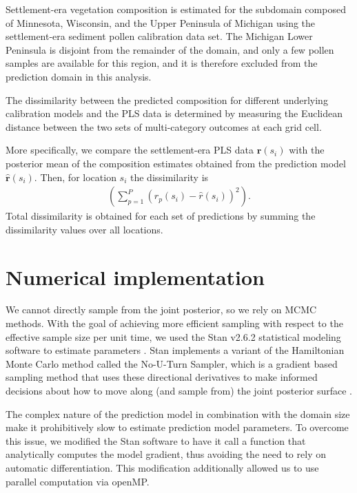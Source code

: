 \documentclass[12pt]{article}
\begin{document}
Settlement-era vegetation composition is estimated for the subdomain
composed of Minnesota, Wisconsin, and the Upper Peninsula of Michigan
using the settlement-era sediment pollen calibration data set. The
Michigan Lower Peninsula is disjoint from the remainder of the domain,
and only a few pollen samples are available for this region, and it is
therefore excluded from the prediction domain in this analysis.

The dissimilarity between the predicted composition for different
underlying calibration models and the PLS data is determined by
measuring the Euclidean distance between the two sets of
multi-category outcomes at each grid cell.

More specifically, we compare the settlement-era PLS data
$\bm{r}(s_i)$ with the posterior mean of the composition estimates
obtained from the prediction model $\hat{\bm{r}}(s_i)$. Then, for
location $s_i$ the dissimilarity is
\begin{align*}
\left( \sum_{p=1}^{P} (r_p(s_i) - \hat{r}(s_i))^2 \right).
\end{align*}
Total dissimilarity is obtained for each set of predictions by summing
the dissimilarity values over all locations.

\section{Numerical implementation}
\label{sec:imp}

We cannot directly sample from the joint posterior, so we rely on MCMC
methods. With the goal of achieving more efficient sampling with
respect to the effective sample size per unit time, we used the Stan
v2.6.2 statistical modeling software to estimate parameters
\citep{stan-software:2014}. Stan implements a variant of the
Hamiltonian Monte Carlo method called the No-U-Turn Sampler, which is
a gradient based sampling method that uses these directional
derivatives to make informed decisions about how to move along (and
sample from) the joint posterior surface \citep{hoffman2011nuts}.

The complex nature of the prediction model in combination with the
domain size make it prohibitively slow to estimate prediction model
parameters. To overcome this issue, we modified the Stan software to
have it call a function that analytically computes the model gradient,
thus avoiding the need to rely on automatic differentiation. This
modification additionally allowed us to use parallel computation via
openMP.
\end{document}
